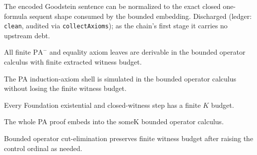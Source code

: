 \begin{theorem}\label{thm:pathBGoodsteinSentenceShape}
  \leanok
The encoded Goodstein sentence can be normalized to the exact closed one-formula sequent shape
consumed by the bounded embedding.  Discharged (ledger: \texttt{clean}, audited via
\texttt{collectAxioms}); as the chain's first stage it carries no upstream debt.
\end{theorem}

\begin{theorem}\label{thm:pathBPeanoMinusAxiomLeaves}
  \notready
All finite \(\mathrm{PA}^{-}\) and equality axiom leaves are derivable in the bounded operator
calculus with finite extracted witness budget.
\end{theorem}

\begin{theorem}\label{thm:pathBInductionAxiomShell}
  \notready
The PA induction-axiom shell is simulated in the bounded operator calculus without losing the finite
witness budget.
\end{theorem}

\begin{theorem}\label{thm:pathBClosedWitnessBudgets}
  \notready
Every Foundation existential and closed-witness step has a finite \(K\) budget.
\end{theorem}

\begin{theorem}\label{thm:pathBSomeKStructuralEmbedding}
  \notready
The whole PA proof embeds into the \(\mathrm{someK}\) bounded operator calculus.
\end{theorem}

\begin{theorem}\label{thm:pathBOperatorCutElimination}
  \notready
Bounded operator cut-elimination preserves finite witness budget after raising the control ordinal
as needed.
\end{theorem}

